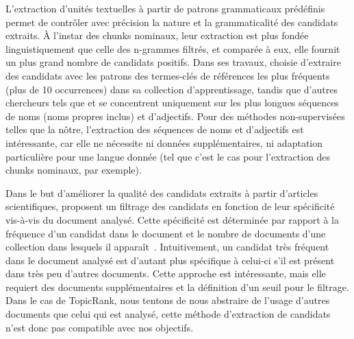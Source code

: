     L'extraction d'unités textuelles à partir de patrons grammaticaux prédéfinis
    permet de contrôler avec précision la nature et la grammaticalité des
    candidats extraits. À l'instar des chunks nominaux, leur extraction est plus
    fondée linguistiquement que celle des n-grammes filtrés, et comparée à eux,
    elle fournit un plus grand nombre de candidats positifs. Dans ses travaux,
     choisie d'extraire des candidats avec
    les patrons des termes-clés de références les plus fréquents (plus de 10
    occurrences) dans sa collection d'apprentissage, tandis que d'autres
    chercheurs tels que  et
     se concentrent uniquement sur les plus
    longues séquences de noms (noms propres inclus) et d'adjectifs. Pour des
    méthodes non-supervisées telles que la nôtre, l'extraction des séquences de 
    noms et d'adjectifs est intéressante, car elle ne nécessite ni données
    supplémentaires, ni adaptation particulière pour une langue donnée (tel que
    c'est le cas pour l'extraction des chunks nominaux, par exemple).

    Dans le but d'améliorer la qualité des candidats extraits à partir
    d'articles scientifiques,  proposent un
    filtrage des candidats en fonction de leur spécificité vis-à-vis du document
    analysé. Cette spécificité est déterminée par rapport à la fréquence d'un
    candidat dans le document et le nombre de documents d'une collection dans
    lesquels il apparaît~\cite[TF-IDF]{jones1972tfidf}. Intuitivement, un
    candidat très fréquent dans le document analysé est d'autant plus spécifique
    à celui-ci s'il est présent dans très peu d'autres documents. Cette approche
    est intéressante, mais elle requiert des documents  supplémentaires et la
    définition d'un seuil pour le filtrage. Dans le cas de TopicRank, nous
    tentons de nous abstraire de l'usage d'autres documents que celui qui est
    analysé, cette méthode d'extraction de candidats n'est donc pas compatible
    avec nos objectifs.

